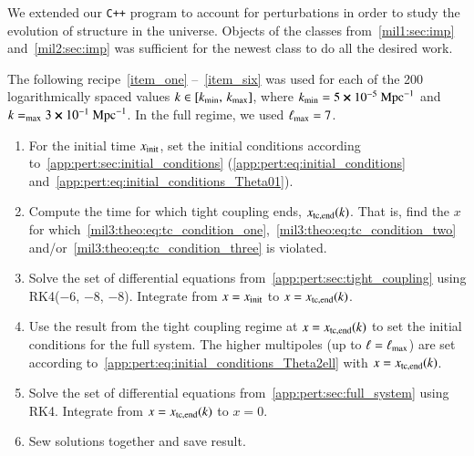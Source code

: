 


We extended our \verb|C++| program to account for perturbations in order to study the evolution of structure in the universe. Objects of the classes from~\cref{mil1:sec:imp} and~\cref{mil2:sec:imp} was sufficient for the newest class to do all the desired work. 



The following recipe~\ref{item_one} --~\ref{item_six} was used for each of the 200 logarithmically spaced values $k\in [k_\mathrm{min},\, k_\mathrm{max}]$, where $k_\mathrm{min} = 5\cross10^{-5}~\mathrm{Mpc}^{-1}$ and $k=_\mathrm{max}3\cross 10^{-1}~\mathrm{Mpc}^{-1}$. In the full regime, we used $\ell_\mathrm{max}=7$.

\begin{enumerate}[wide,labelwidth=!,labelindent=0pt,label=(\roman*)]
    \item\label{item_one} 
    For the initial time $x_\mathrm{init}$, set the initial conditions according to~\cref{app:pert:sec:initial_conditions} (\cref{app:pert:eq:initial_conditions} and~\eqref{app:pert:eq:initial_conditions_Theta01}). 

    \item\label{item_two} 
    
    Compute the time for which tight coupling ends, $x_\mathrm{tc,end}(k)$. That is, find the $x$ for which~\cref{mil3:theo:eq:tc_condition_one},~\eqref{mil3:theo:eq:tc_condition_two} and/or~\eqref{mil3:theo:eq:tc_condition_three} is violated. 
    
    \item\label{item_three}
    
    Solve the set of differential equations from~\cref{app:pert:sec:tight_coupling} using RK4($-6$, $-8$, $-8$). Integrate from $x=x_\mathrm{init}$ to $x=x_\mathrm{tc,end}(k)$.

    \item\label{item_four}
    
    Use the result from the tight coupling regime at $x=x_\mathrm{tc,end}(k)$ to set the initial conditions for the full system. The higher multipoles (up to $\ell=\ell_\mathrm{max}$) are set according to~\cref{app:pert:eq:initial_conditions_Theta2ell} with $x=x_\mathrm{tc,end}(k)$. 

    \item\label{item_five}
    
    Solve the set of differential equations from~\cref{app:pert:sec:full_system} using RK4. Integrate from $x=x_\mathrm{tc,end}(k)$ to $x=0$. 

    \item\label{item_six}
    
    Sew solutions together and save result.

\end{enumerate}
 
